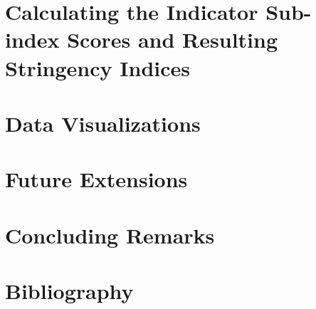 \documentclass[11pt, a4paper, leqno]{article}
\begin{document}



\section{Calculating the Indicator Sub-index Scores and Resulting Stringency Indices} %
\label{sec:section2}




\section{Data Visualizations} %
\label{sec:section3}

%


\section{Future Extensions} %
\label{sec:section4}

%


\section*{Concluding Remarks} %
\label{sec:conclusion}

%


\clearpage

\section*{Bibliography} %
\label{sec:bibliography}


\printbibliography
{}





\end{document}
